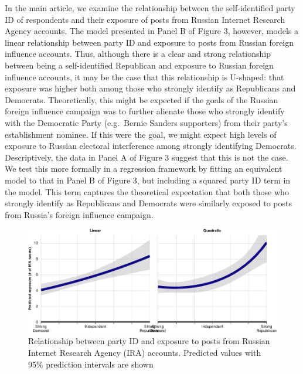 \documentclass[
  12pt,
]{article}
\begin{document}
In the main article, we examine the relationship between the self-identified party ID of respondents and their exposure of posts from Russian Internet Research Agency accounts. The model presented in Panel B of Figure 3, however, models a linear relationship between party ID and exposure to posts from Russian foreign influence accounts. Thus, although there is a clear and strong relationship between being a self-identified Republican and exposure to Russian foreign influence accounts, it may be the case that this relationship is U-shaped: that exposure was higher both among those who strongly identify as Republicans and Democrats. Theoretically, this might be expected if the goals of the Russian foreign influence campaign was to further alienate those who strongly identify with the Democratic Party (e.g.~Bernie Sanders supporters) from their party's establishment nominee. If this were the goal, we might expect high levels of exposure to Russian electoral interference among strongly identifying Democrats. Descriptively, the data in Panel A of Figure 3 suggest that this is not the case. We test this more formally in a regression framework by fitting an equivalent model to that in Panel B of Figure 3, but including a squared party ID term in the model. This term captures the theoretical expectation that both those who strongly identify as Republicans and Democrats were similarly exposed to posts from Russia's foreign influence campaign.

\begin{figure}
\centering
\includegraphics{Supplementary_Information_files/figure-latex/Supplementary-Figure-C5-1.pdf}
\caption{\label{fig:Supplementary-Figure-C5}Relationship between party ID and exposure to posts from Russian Internet Research Agency (IRA) accounts. Predicted values with 95\% prediction intervals are shown}
\end{figure}
\end{document}
